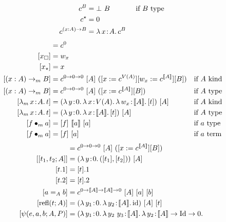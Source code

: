 \begin{figure}
    \centering
    \begin{align*}
        c^B &= \bot\ B \hspace{0.5in}\text{if $B$ type} \\
        c^\star &= 0 \\
        c^{(x : A) \to B} &= {\lambda}\, x\! : \! A.\, c^B
    \end{align*}
    \begin{align*}
        [*] &= c^0 \\
        [ x_{\square} ] &= w_x \\
        [ x_\star ] &= x \\
        [(x : A) \to_m B] &= c^{0 \to 0 \to 0}\ [A]\ ([x := c^{V(A)}][w_x := c^{\sema{A}}][B]) &\text{if}& \text{ $A$ kind} \\
        [(x : A) \to_m B] &= c^{0 \to 0 \to 0}\ [A]\ ([x := c^{\sema{A}}][B]) &\text{if}& \text{ $A$ type} \\
        [\abs{\lambda_m}{x}{A}{t}] &= (\abs{\lambda}{y}{0}{
            \abs{\lambda}{x}{V(A)}{
                \abs{\lambda}{w_x}{\sema{A}}{[t]}
            }
        })\ [A] &\text{if}& \text{ $A$ kind} \\
        [\abs{\lambda_m}{x}{A}{t}] &= (\abs{\lambda}{y}{0}{
            \abs{\lambda}{x}{\sema{A}}{[t]}
        })\ [A] &\text{if}& \text{ $A$ type} \\
        [\app{f}{m}{a}] &= [f]\ \sema{a}\ [a] &\text{if}& \text{ $a$ type} \\
        [\app{f}{m}{a}] &= [f]\ [a] &\text{if}& \text{ $a$ term} \\
    \end{align*}
    \begin{align*}
        [(x : A) \cap B] &= c^{0 \to 0 \to 0}\ [A]\ ([x := c^{\sema{A}}][B]) \\
        [[t_1, t_2; A]] &= (\abs{\lambda}{y}{0}{([t_1], [t_2])})\ [A] \\
        [t.1] &= [t].1 \\
        [t.2] &= [t].2 \\
        [a =_A b] &= c^{0 \to \sema{A} \to \sema{A} \to 0}\ [A]\ [a]\ [b] \\
        [\text{refl}(t; A)] &= (\abs{\lambda}{y_1}{0}{
                \abs{\lambda}{y_2}{\sema{A}}{\fpid}
            })\ [A]\ [t] \\
        [\psi(e, a, b; A, P)] &= (\abs{\lambda}{y_1}{0}{
                \abs{\lambda}{y_2\ y_3}{\sema{A}}{
                    \abs{\lambda}{y_2}{\sema{A} \to \fpId \to 0}{
}}}
\end{align*}
\end{figure}
